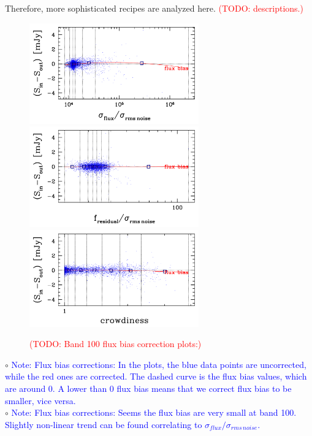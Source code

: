 \documentclass[11pt,a4paper]{article}
\begin{document}
Therefore, more sophisticated recipes are analyzed here. \textcolor{red}{(TODO: descriptions.)}

\begin{figure}[H]
	\caption{
		\textcolor{red}{(TODO: Band 100 flux bias correction plots:)}
	}
	\includegraphics[width=0.65\textwidth]{galsim_100_fbias_1}
	\includegraphics[width=0.65\textwidth]{galsim_100_fbias_2}
	\includegraphics[width=0.65\textwidth]{galsim_100_fbias_3}
\end{figure}

\indent\hspace{15pt}$\circ$ 
\textcolor{blue}{Note: Flux bias corrections: In the plots, the blue data points are uncorrected, while the red ones are corrected. The dashed curve is the flux bias values, which are around 0. A lower than 0 flux bias means that we correct flux bias to be smaller, vice versa. }
\\
\indent\hspace{15pt}$\circ$ 
\textcolor{blue}{Note: Flux bias corrections: Seems the flux bias are very small at band 100. Slightly non-linear trend can be found correlating to $\sigma_{flux}/\sigma_{rms\,noise}$. }
\\
\end{document}
